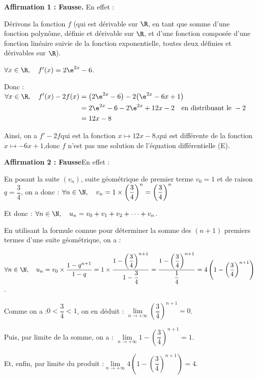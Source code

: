 \textbf{Affirmation 1 : Fausse.}\quad
En effet :

Dérivons la fonction $f$ (qui est dérivable sur $\R$, en tant que somme d'une fonction polynôme, définie et dérivable sur $\R$, et d'une fonction composée d'une fonction linéaire suivie de la fonction exponentielle, toutes deux définies et dérivables sur $\R$).

$\forall x \in \R,\quad f'(x) = 2\e^{2x} - 6$.

Donc :\quad $\begin{aligned}[t] \forall x\in \R,\quad f'(x) - 2f(x)
	&	= \big(2\e^{2x} - 6\big) - 2\big(\e^{2x} - 6x + 1\big)\\
	&	= 2\e^{2x} - 6 - 2\e^{2x} + 12x -2 \quad\text{en distribuant le }- 2\\
	&	= 12x -8\\	\end{aligned}$

Ainsi, on a \quad $f' - 2f$\quad qui est la fonction \quad $x \longmapsto 12x - 8$,\quad qui est différente de la fonction \quad $x \longmapsto -6x + 1$,\quad donc $f$ n'est pas une solution de l'équation différentielle (E).

\medskip

\textbf{Affirmation 2 : Fausse}\quad 	En effet :

En posant la suite $\left(v_n\right)$, suite géométrique de premier terme $v_0 = 1$ et de raison $q = \dfrac{3}{4}$, on a donc :\quad
	$\forall n \in \N, \quad v_n = 1\times \left(\dfrac{3}{4}\right)^n = \left(\dfrac{3}{4}\right)^n$

Et donc  : \quad $\forall n \in \N,\quad u_n = v_0 + v_1 + v_2 + \dots +v_n$.

En utilisant la formule connue pour déterminer la somme des $(n+1)$ premiers termes d'une suite géométrique, on a :

$\forall n \in \N,\quad u_n = v_0 \times \dfrac{1 - q^{n+1}}{1 - q} = 1\times \dfrac{1 - \left(\dfrac{3}{4}\right)^{n+1}}{1 - \dfrac{3}{4}} = \dfrac{1 - \left(\dfrac{3}{4}\right)^{n+1}}{\dfrac{1}{4}} = 4\left(1 - \left(\dfrac{3}{4}\right)^{n+1}\right)$.

Comme on a :\quad $0< \dfrac{3}{4} < 1$, \quad on en déduit : \quad$\lim\limits_{n \to +\infty} \left(\dfrac{3}{4}\right)^{n+1} = 0$.

Puis, par limite de la somme, on a : \quad$\lim\limits_{n \to +\infty} 1 - \left(\dfrac{3}{4}\right)^{n+1} = 1$.

Et, enfin, par limite du produit :\quad$\lim\limits_{n \to +\infty} 4\left( 1-\left(\dfrac{3}{4}\right)^{n+1}\right) = 4$.

